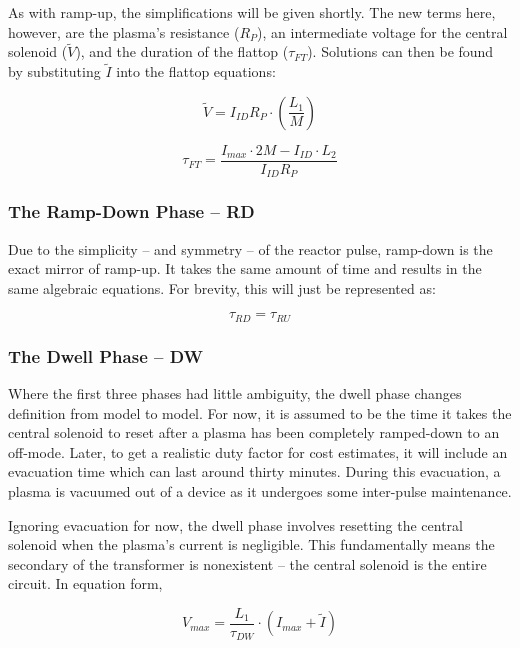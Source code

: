 As with ramp-up, the simplifications will be given shortly. The new terms here, however, are the plasma's resistance ($R_P$), an intermediate voltage for the central solenoid ($\tilde V$), and the duration of the flattop ($\tau_{FT}$). Solutions can then be found by substituting $\tilde I$ into the flattop equations:

\begin{equation}
	\tilde V = I_{ID} R_P \cdot \left( \frac{L_1}{M} \right)	
\end{equation}

\begin{equation}
	\label{eq:tauft}
	\tau_{FT} = \frac{ I_{max} \cdot 2 M - I_{ID} \cdot  L_2 }{I_{ID} R_P}
\end{equation}

\subsubsection{The Ramp-Down Phase -- RD}

Due to the simplicity -- and symmetry -- of the reactor pulse, ramp-down is the exact mirror of ramp-up. It takes the same amount of time and results in the same algebraic equations. For brevity, this will just be represented as:

\begin{equation}
	\label{eq:taurd}
	\tau_{RD} = \tau_{RU}
\end{equation}

\subsubsection{The Dwell Phase -- DW}

Where the first three phases had little ambiguity, the dwell phase changes definition from model to model. For now, it is assumed to be the time it takes the central solenoid to reset after a plasma has been completely ramped-down to an off-mode. Later, to get a realistic duty factor for cost estimates, it will include an evacuation time which can last around thirty minutes. During this evacuation, a plasma is vacuumed out of a device as it undergoes some inter-pulse maintenance.

Ignoring evacuation for now, the dwell phase involves resetting the central solenoid when the plasma's current is negligible. This fundamentally means the secondary of the transformer is nonexistent -- the central solenoid is the entire circuit. In equation form,

\begin{equation}
	V_{max} = \frac{L_1}{\tau_{DW}} \cdot \left( I_{max} + \tilde I \right) 
\end{equation}

